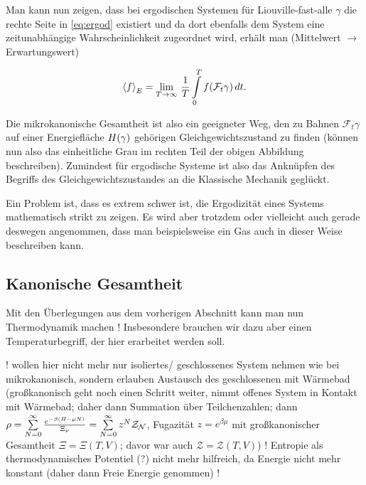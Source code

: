 Man kann nun zeigen, dass bei ergodischen Systemen für Liouville-fast-alle $\gamma$ die rechte Seite in \eqref{eq:ergod} existiert und da dort ebenfalls dem System eine zeitunabhängige Wahrscheinlichkeit zugeordnet wird, erhält man (Mittelwert $\rightarrow$ Erwartungswert)

\begin{equation}
\expval{f}_E = \lim_{T \rightarrow \infty} \, \frac{1}{T} \int\limits_0^T f\qty(\mathcal{F}_t \gamma) \, dt .
\end{equation}

Die mikrokanonische Gesamtheit ist also ein geeigneter Weg, den zu Bahnen $\mathcal{F}_t \gamma$ auf einer Energiefläche $H\qty(\gamma)$ gehörigen Gleichgewichtszustand zu finden (können nun also das einheitliche Grau im rechten Teil der obigen Abbildung beschreiben). Zumindest für ergodische Systeme ist also das Anknüpfen des Begriffs des Gleichgewichtszustandes an die Klassische Mechanik geglückt.

Ein Problem ist, dass es extrem schwer ist, die Ergodizität eines Systems mathematisch strikt zu zeigen. Es wird aber trotzdem oder vielleicht auch gerade deswegen angenommen, dass man beispielsweise ein Gas auch in dieser Weise beschreiben kann.






	\subsection{Kanonische Gesamtheit}
Mit den Überlegungen aus dem vorherigen Abschnitt kann man nun Thermodynamik machen ! Insbesondere brauchen wir dazu aber einen Temperaturbegriff, der hier erarbeitet werden soll.

! wollen hier nicht mehr nur isoliertes/ geschlossenes System nehmen wie bei mikrokanonisch, sondern erlauben Austausch des geschlossenen mit Wärmebad (großkanonisch geht noch einen Schritt weiter, nimmt offenes System in Kontakt mit Wärmebad; daher dann Summation über Teilchenzahlen; dann $\rho = \sum\limits_{N = 0}^\infty \frac{e^{-\beta \qty(H - \mu N)}}{\Xi_\nu} = \sum\limits_{N = 0}^\infty z^N \mathcal{Z_N}$, Fugazität $z = e^{\beta \mu}$ mit großkanonischer Gesamtheit $\Xi = \Xi(T, V)$; davor war auch $\mathcal{Z} = \mathcal{Z}(T, V)$) ! Entropie als thermodynamisches Potentiel (?) nicht mehr hilfreich, da Energie nicht mehr konstant (daher dann Freie Energie genommen) !

